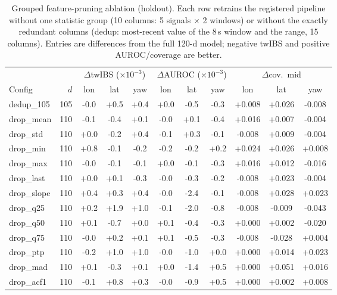 \begin{table}[!t]
\caption{Grouped feature-pruning ablation (holdout). Each row retrains the registered pipeline without one statistic group (10 columns: 5 signals $\times$ 2 windows) or without the exactly redundant columns (dedup: most-recent value of the 8\,s window and the range, 15 columns). Entries are differences from the full 120-d model; negative twIBS and positive AUROC/coverage are better.}
\label{tab:featprune}
\centering
\footnotesize
\setlength{\tabcolsep}{2.4pt}
\begin{tabular}{lrccccccccc}
\toprule
 & & \multicolumn{3}{c}{$\Delta$twIBS ($\times 10^{-3}$)} & \multicolumn{3}{c}{$\Delta$AUROC ($\times 10^{-3}$)} & \multicolumn{3}{c}{$\Delta$cov.\ mid} \\
\cmidrule(lr){3-5}\cmidrule(lr){6-8}\cmidrule(lr){9-11}
Config & $d$ & lon & lat & yaw & lon & lat & yaw & lon & lat & yaw \\
\midrule
dedup\_105 & 105 & -0.0 & +0.5 & +0.4 & +0.0 & -0.5 & -0.3 & +0.008 & +0.026 & -0.008 \\
drop\_mean & 110 & -0.1 & -0.4 & +0.1 & -0.0 & +0.1 & -0.4 & +0.016 & +0.007 & -0.004 \\
drop\_std & 110 & +0.0 & -0.2 & +0.4 & -0.1 & +0.3 & -0.1 & -0.008 & +0.009 & -0.004 \\
drop\_min & 110 & +0.8 & -0.1 & -0.2 & -0.2 & -0.2 & +0.2 & +0.024 & +0.026 & +0.008 \\
drop\_max & 110 & -0.0 & -0.1 & -0.1 & +0.0 & -0.1 & -0.3 & +0.016 & +0.012 & -0.016 \\
drop\_last & 110 & +0.0 & +0.1 & -0.3 & -0.0 & -0.3 & -0.2 & -0.008 & +0.023 & -0.004 \\
drop\_slope & 110 & +0.4 & +0.3 & +0.4 & -0.0 & -2.4 & -0.1 & -0.008 & +0.028 & +0.023 \\
drop\_q25 & 110 & +0.2 & +1.9 & +1.0 & -0.1 & -2.0 & -0.8 & -0.008 & -0.009 & -0.043 \\
drop\_q50 & 110 & +0.1 & -0.7 & +0.0 & +0.1 & -0.4 & -0.3 & +0.000 & +0.002 & -0.020 \\
drop\_q75 & 110 & -0.0 & +0.2 & +0.1 & +0.1 & -0.5 & -0.3 & -0.008 & -0.028 & +0.004 \\
drop\_ptp & 110 & -0.2 & +1.0 & +1.0 & -0.0 & -1.0 & +0.0 & +0.000 & +0.014 & +0.023 \\
drop\_mad & 110 & +0.1 & -0.3 & +0.1 & +0.0 & -1.4 & +0.5 & +0.000 & +0.051 & +0.016 \\
drop\_acf1 & 110 & -0.1 & +0.8 & +0.3 & -0.0 & -0.9 & +0.5 & +0.000 & +0.002 & +0.008 \\
\bottomrule
\end{tabular}
\end{table}

